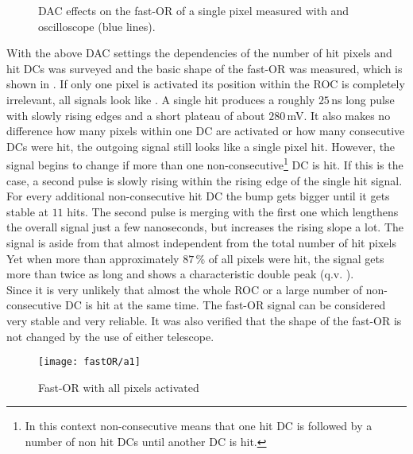 \begin{figure}[ht]
	\centering
	\hfill
	\caption{\ac{DAC} effects on the fast-OR of a single pixel measured with and oscilloscope (blue lines).}
	\label{pfastor}
\end{figure}\no
With the above \ac{DAC} settings the dependencies of the number of hit pixels and hit \ac{DC}s was surveyed and the basic shape of the fast-OR was measured, which is shown in . If only one pixel is activated its position within the \ac{ROC} is completely irrelevant, all signals look like . A single hit produces a roughly $25\,$ns long pulse with slowly rising edges and a short plateau of about $280\,$mV. It also makes no difference how many pixels within one \ac{DC} are activated or how many consecutive \ac{DC}s were hit, the outgoing signal still looks like a single pixel hit. However, the signal begins to change if more than one non-consecutive\footnote{In this context non-consecutive means that one hit \ac{DC} is followed by a number of non hit \ac{DC}s until another \ac{DC} is hit.} \ac{DC} is hit. If this is the case, a second pulse is slowly rising within the rising edge of the single hit signal. For every additional non-consecutive hit \ac{DC} the bump gets bigger until it gets stable at $11$ hits. The second pulse is merging with the first one which lengthens the overall signal just a few nanoseconds, but increases the rising slope a lot. The signal is aside from that almost independent from the total number of hit pixels Yet when more than approximately $87\,$\% of all pixels were hit, the signal gets more than twice as long and shows a characteristic double peak (q.v. ).\\
Since it is very unlikely that almost the whole \ac{ROC} or a large number of non-consecutive \ac{DC} is hit at the same time. The fast-OR signal can be considered very stable and very reliable. It was also verified that the shape of the fast-OR is not changed by the use of either telescope.
\begin{figure}[ht]
	\centering
	\texttt{[image: fastOR/a1]}
	\caption{Fast-OR with all pixels activated}
	\label{pallfast}
\end{figure}\no
